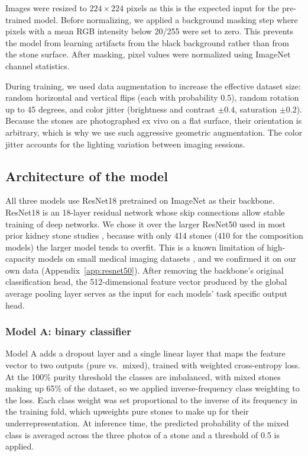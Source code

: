 \documentclass[10pt,twocolumn]{article}
\begin{document}
Images were resized to $224 \times 224$ pixels as this is the expected input for the pre-trained model. Before normalizing, we applied a background masking step where pixels with a mean RGB intensity below 20/255 were set to zero. This prevents the model from learning artifacts from the black background rather than from the stone surface. After masking, pixel values were normalized using ImageNet channel statistics.

During training, we used data augmentation to increase the effective dataset size: random horizontal and vertical flips (each with probability 0.5), random rotation up to 45 degrees, and color jitter (brightness and contrast $\pm 0.4$, saturation $\pm 0.2$). Because the stones are photographed ex vivo on a flat surface, their orientation is arbitrary, which is why we use such aggressive geometric augmentation. The color jitter accounts for the lighting variation between imaging sessions.

\subsection*{Architecture of the model}

All three models use ResNet18 \cite{He2016} pretrained on ImageNet as their backbone. ResNet18 is an 18-layer residual network whose skip connections allow stable training of deep networks. We chose it over the larger ResNet50 used in most prior kidney stone studies \cite{LopezTiro2024, veltheer2025}, because with only 414 stones (410 for the composition models) the larger model tends to overfit. This is a known limitation of high-capacity models on small medical imaging datasets \cite{Raghu2019}, and we confirmed it on our own data (Appendix~\ref{app:resnet50}). After removing the backbone's original classification head, the 512-dimensional feature vector produced by the global average pooling layer serves as the input for each models' task specific output head.

\subsubsection*{Model A: binary classifier}

Model A adds a dropout layer and a single linear layer that maps the feature vector to two outputs (pure vs.\ mixed), trained with weighted cross-entropy loss. At the 100\% purity threshold the classes are imbalanced, with mixed stones making up 65\% of the dataset, so we applied inverse-frequency class weighting to the loss. Each class weight was set proportional to the inverse of its frequency in the training fold, which upweights pure stones to make up for their underrepresentation. At inference time, the predicted probability of the mixed class is averaged across the three photos of a stone and a threshold of 0.5 is applied.
\end{document}
